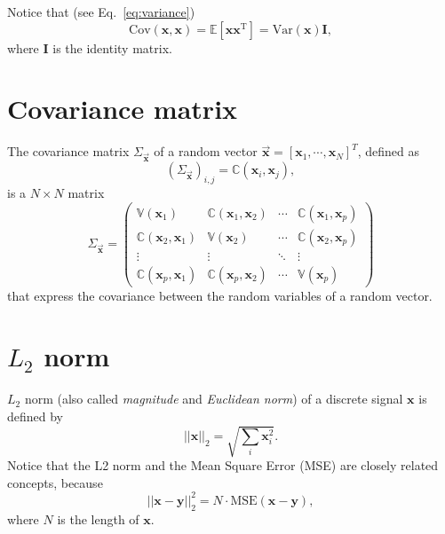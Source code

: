 Notice that (see Eq.~\ref{eq:variance})
\begin{equation}
  \text{Cov}(\bm{x}, \bm{x}) = \mathbb{E}[\bm{x}\bm{x}^{\text{T}}]= \text{Var}(\bm{x})\bm{I},
\end{equation}
where $\bm{I}$ is the identity matrix.


\section{Covariance matrix}
\label{sec:covariance_matrix}

The covariance matrix $\Sigma_{\overrightarrow{\mathbf{x}}}$ of a
random vector
$\overrightarrow{\mathbf{x}}=[\mathbf{x}_1,\cdots,\mathbf{x}_N]^T$,
defined as
\begin{equation}
  (\Sigma_{\overrightarrow{\mathbf{x}}})_{i,j}=\mathbb{C}(\mathbf{x}_i,\mathbf{x}_j),
\end{equation}
is a $N\times N$ matrix
\begin{equation}
\Sigma_{\overrightarrow{\mathbf{x}}} = 
\begin{pmatrix}
\mathbb{V}(\mathbf{x}_1) & \mathbb{C}(\mathbf{x}_1, \mathbf{x}_2) & \cdots & \mathbb{C}(\mathbf{x}_1, \mathbf{x}_p) \\
\mathbb{C}(\mathbf{x}_2, \mathbf{x}_1) & \mathbb{V}(\mathbf{x}_2) & \cdots & \mathbb{C}(\mathbf{x}_2, \mathbf{x}_p) \\
\vdots & \vdots & \ddots & \vdots \\
\mathbb{C}(\mathbf{x}_p, \mathbf{x}_1) & \mathbb{C}(\mathbf{x}_p, \mathbf{x}_2) & \cdots & \mathbb{V}(\mathbf{x}_p)
\end{pmatrix}
\end{equation}
that express the covariance between the random variables of a random vector.


\section{$L_2$ norm}
\label{sec:L2_norm}
\label{sec:covariance_matrix}

$L_2$ norm (also called \emph{magnitude} and \emph{Euclidean norm}) of
a discrete signal $\mathbf{x}$ is defined by
\begin{equation}
  ||\mathbf{x}||_2 = \sqrt{\sum_i\mathbf{x}_i^2}.
\end{equation}
Notice that the L2 norm and the Mean Square Error (MSE) are closely
related concepts, because
\begin{equation}
  ||\mathbf{x} - \mathbf{y}||_2^2 = N\cdot\text{MSE}(\mathbf{x} - \mathbf{y}),
\end{equation}
where $N$ is the length of $\mathbf{x}$.

